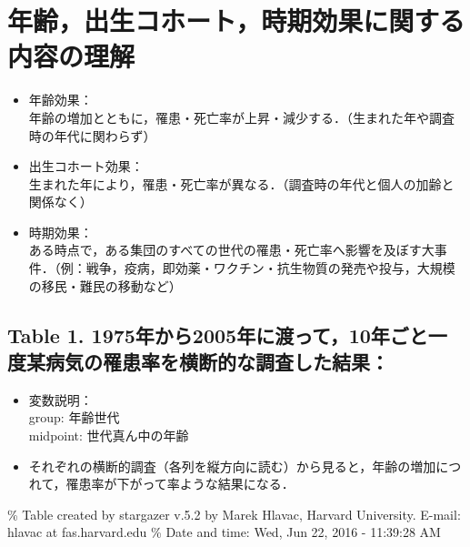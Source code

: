 \documentclass[11pt,]{article}
\providecommand{\tightlist}{%
  \setlength{\itemsep}{0pt}\setlength{\parskip}{0pt}}
\begin{document}
\section{年齢，出生コホート，時期効果に関する内容の理解}

\begin{itemize}
\tightlist
\item
  年齢効果：\\
  年齢の増加とともに，罹患・死亡率が上昇・減少する．（生まれた年や調査時の年代に関わらず）
\item
  出生コホート効果：\\
  生まれた年により，罹患・死亡率が異なる．（調査時の年代と個人の加齢と関係なく）
\item
  時期効果：\\
  ある時点で，ある集団のすべての世代の罹患・死亡率へ影響を及ぼす大事件．（例：戦争，疫病，即効薬・ワクチン・抗生物質の発売や投与，大規模の移民・難民の移動など）
\end{itemize}

\subsection{Table 1.
1975年から2005年に渡って，10年ごと一度某病気の罹患率を横断的な調査した結果：}\label{table-1.-1975200510}

\begin{itemize}
\tightlist
\item
  変数説明：\\
  group: 年齢世代\\
  midpoint: 世代真ん中の年齢\\
\item
  それぞれの横断的調査（各列を縦方向に読む）から見ると，年齢の増加につれて，罹患率が下がって率ような結果になる．
\end{itemize}

\% Table created by stargazer v.5.2 by Marek Hlavac, Harvard University.
E-mail: hlavac at fas.harvard.edu \% Date and time: Wed, Jun 22, 2016 -
11:39:28 AM
\end{document}
